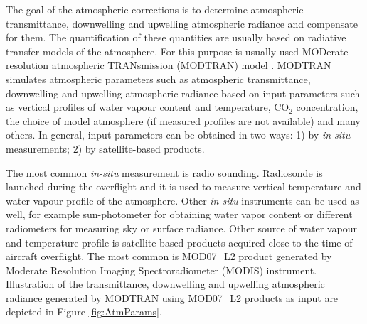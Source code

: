 The goal of the atmospheric corrections is to determine atmospheric transmittance, downwelling and upwelling atmospheric radiance and compensate for them. The quantification of these quantities are usually based on radiative transfer models of the atmosphere. For this purpose is usually used MODerate resolution atmospheric TRANsmission (MODTRAN) model \cite{BG06}. MODTRAN simulates atmospheric parameters such as atmospheric transmittance, downwelling and upwelling atmospheric radiance based on input parameters such as vertical profiles of water vapour content and temperature, CO$_2$ concentration, the choice of model atmosphere (if measured profiles are not available) and many others. In general, input parameters can be obtained in two ways: 1) by \textit{in-situ} measurements; 2) by satellite-based products.

The most common \textit{in-situ} measurement is radio sounding. Radiosonde is launched during the overflight and it is used to measure vertical temperature and water vapour profile of the atmosphere. Other \textit{in-situ} instruments can be used as well, for example sun-photometer for obtaining water vapor content or different radiometers for measuring sky or surface radiance. Other source of water vapour and temperature profile is satellite-based products acquired close to the time of aircraft overflight. The most common is MOD07\_L2 product \cite{B11} generated by Moderate Resolution Imaging Spectroradiometer (MODIS) instrument. Illustration of the transmittance, downwelling and upwelling atmospheric radiance generated by MODTRAN using MOD07\_L2 products as input are depicted in Figure \ref{fig:AtmParams}.

